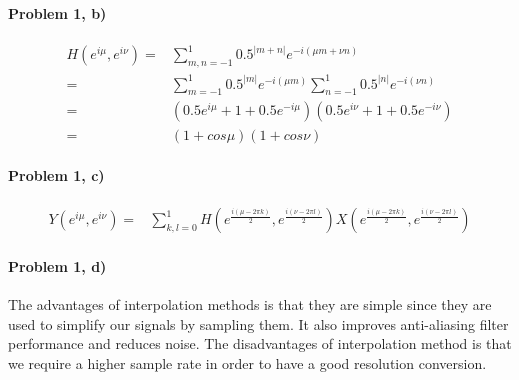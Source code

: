 \documentclass[11pt]{article}
\begin{document}
\paragraph{\noindent\textbf{\LARGE{Problem 1, b)}}}  
\begin{equation*}
\begin{split}
H(e^{i\mu}, e^{i\nu}) = & \sum_{m,n = -1}^1 0.5^{|m+n|} e^{-i(\mu m + \nu n)} \\
    = & \sum_{m = -1}^1 0.5^{|m|} e^{-i(\mu m)} \sum_{n = -1}^1 0.5^{|n|} e^{-i(\nu n)} \\
    = & (0.5e^{i\mu} + 1 + 0.5e^{-i\mu})(0.5e^{i\nu} + 1 + 0.5e^{-i\nu}) \\
    = & (1 + cos \mu) (1 + cos\nu)
\end{split}
\end{equation*}

\paragraph{\noindent\textbf{\LARGE{Problem 1, c)}}}  
\begin{equation*}
\begin{split}
Y(e^{i\mu}, e^{i\nu}) = & \sum_{k,l = 0}^1 H(e^{\frac{i(\mu - 2\pi k)}{2}}, e^{\frac{i(\nu - 2\pi l)}{2}}) 
X(e^{\frac{i(\mu - 2\pi k)}{2}}, e^{\frac{i(\nu - 2\pi l)}{2}})
\end{split}
\end{equation*}

\paragraph{\noindent\textbf{\LARGE{Problem 1, d)}}}  
  
\begin{flushleft}
The advantages of interpolation methods is that they are simple since they are used to simplify our signals by sampling them.
It also improves anti-aliasing filter performance and reduces noise. 
\newline
\newline
The disadvantages of interpolation method is that we require a higher sample rate in order to have a good resolution conversion.
\end{flushleft} 
    
\end{document}
